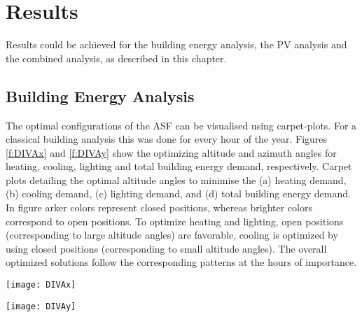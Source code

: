\chapter{Results}


Results could be achieved for the building energy analysis, the PV analysis and the combined analysis, as described in this chapter.

\section{Building Energy Analysis}
	
	The optimal configurations of the ASF can be visualised using carpet-plots. For a classical building analysis this was done for every hour of the year. Figures \ref{f:DIVAx} and \ref{f:DIVAy} show the optimizing altitude and azimuth angles for heating, cooling, lighting and total building energy demand, respectively. Carpet plots detailing the optimal altitude angles to minimise the (a) heating demand, (b) cooling demand, (c) lighting demand, and (d) total building energy demand. In figure arker colors represent closed positions, whereas brighter colors correspond to open positions. To optimize heating and lighting, open positions (corresponding to large altitude angles) are favorable, cooling is optimized by using closed positions (corresponding to small altitude angles). The overall optimized solutions follow the corresponding patterns at the hours of importance.  

	\begin{figure*}
		\begin{center}
		\texttt{[image: DIVAx]}
		\caption{Carpet plots detailing the optimal altitude angles to minimise the (a) heating demand, (b) cooling demand, (c) lighting demand, and (d) total building energy demand. Darker colors represent closed positions, whereas brighter colors correspond to open positions. To optimize heating and lighting, open positions are favorable, cooling is optimized by using closed positions.}
		\label{f:DIVAx}
		\end{center}
	\end{figure*}


	\begin{figure*}
		\begin{center}
		\texttt{[image: DIVAy]}
		\caption{Carpet plots detailing the optimal azimuth angles to minimise the (a) heating demand, (b) cooling demand, (c) lighting demand, and (d) total building energy demand. Cooling is minimized by bocking the sun, wheras lighting and heating is minimized by opening the facade to let the insolation in.}
		\label{f:DIVAy}
		\end{center}
	\end{figure*}


